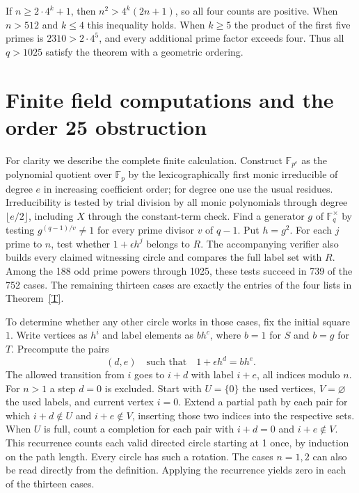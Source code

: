 \documentclass[11pt]{article}
\newcommand{\F}{\mathbb F}
\begin{document}
If $n\ge2\cdot4^k+1$, then $n^2>4^k(2n+1)$, so all four counts are positive. When $n>512$ and $k\le4$ this inequality holds. When $k\ge5$ the product of the first five primes is $2310>2\cdot4^5$, and every additional prime factor exceeds four. Thus all $q>1025$ satisfy the theorem with a geometric ordering.

\section{Finite field computations and the order 25 obstruction}

For clarity we describe the complete finite calculation. Construct $\F_{p^e}$ as the polynomial quotient over $\F_p$ by the lexicographically first monic irreducible of degree $e$ in increasing coefficient order; for degree one use the usual residues. Irreducibility is tested by trial division by all monic polynomials through degree $\lfloor e/2\rfloor$, including $X$ through the constant-term check. Find a generator $g$ of $\F_q^\times$ by testing $g^{(q-1)/v}\ne1$ for every prime divisor $v$ of $q-1$. Put $h=g^2$. For each $j$ prime to $n$, test whether $1+\epsilon h^j$ belongs to $R$. The accompanying verifier also builds every claimed witnessing circle and compares the full label set with $R$. Among the 188 odd prime powers through 1025, these tests succeed in 739 of the 752 cases. The remaining thirteen cases are exactly the entries of the four lists in Theorem~\ref{T}.

To determine whether any other circle works in those cases, fix the initial square $1$. Write vertices as $h^i$ and label elements as $b h^c$, where $b=1$ for $S$ and $b=g$ for $T$. Precompute the pairs
\[
 (d,e)\quad\text{such that}\quad 1+\epsilon h^d=b h^e .
\]
The allowed transition from $i$ goes to $i+d$ with label $i+e$, all indices modulo $n$. For $n>1$ a step $d=0$ is excluded. Start with $U=\{0\}$ the used vertices, $V=\varnothing$ the used labels, and current vertex $i=0$. Extend a partial path by each pair for which $i+d\notin U$ and $i+e\notin V$, inserting those two indices into the respective sets. When $U$ is full, count a completion for each pair with $i+d=0$ and $i+e\notin V$. This recurrence counts each valid directed circle starting at 1 once, by induction on the path length. Every circle has such a rotation. The cases $n=1,2$ can also be read directly from the definition. Applying the recurrence yields zero in each of the thirteen cases.
\end{document}
